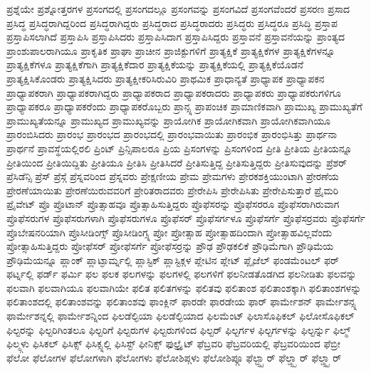 {ಪ್ರಶ್ನೆಯೇ
ಪ್ರಶ್ನೋತ್ತರಗಳ
ಪ್ರಸಂಗದಲ್ಲಿ
ಪ್ರಸಂಗದಲ್ಲೂ
ಪ್ರಸಂಗವನ್ನು
ಪ್ರಸಂಗವಿದೆ
ಪ್ರಸಂಗವೆಂದರೆ
ಪ್ರಸರಣ
ಪ್ರಸಾದ
ಪ್ರಸಿದ್ಧ
ಪ್ರಸಿದ್ಧರಾಗಿದ್ದರಿಂದ
ಪ್ರಸಿದ್ಧರಾಗಿದ್ದರು
ಪ್ರಸಿದ್ಧರಾದ
ಪ್ರಸಿದ್ಧರಾದರು
ಪ್ರಸಿದ್ಧರು
ಪ್ರಸಿದ್ಧರೂ
ಪ್ರಸಿದ್ಧಿ
ಪ್ರಸ್ತಾಪ
ಪ್ರಸ್ತಾಪಿಸಲಾಗಿದೆ
ಪ್ರಸ್ತಾಪಿಸಿ
ಪ್ರಸ್ತಾಪಿಸಿದರು
ಪ್ರಸ್ತಾಪಿಸಿದಾಗ
ಪ್ರಸ್ತಾಪಿಸಿದ್ದರು
ಪ್ರಸ್ತಾವನೆ
ಪ್ರಸ್ತಾವನೆಯನ್ನು
ಪ್ರಾಂತ್ಯದ
ಪ್ರಾಂಶುಪಾಲರಾಗಿಯೂ
ಪ್ರಾಕೃತಿಕ
ಪ್ರಾಘಾ
ಪ್ರಾಚೀನ
ಪ್ರಾಜಿಕ್ಟುಗಳಿಗೆ
ಪ್ರಾತ್ಯಕ್ಷಿಕೆ
ಪ್ರಾತ್ಯಕ್ಷಿಕೆಗಳ
ಪ್ರಾತ್ಯಕ್ಷಿಕೆಗಳನ್ನೂ
ಪ್ರಾತ್ಯಕ್ಷಿಕೆಗಳೂ
ಪ್ರಾತ್ಯಕ್ಷಿಕೆಗಾಗಿ
ಪ್ರಾತ್ಯಕ್ಷಿಕೆದಾರ
ಪ್ರಾತ್ಯಕ್ಷಿಕೆಯನ್ನು
ಪ್ರಾತ್ಯಕ್ಷಿಕೆಯಲ್ಲಿ
ಪ್ರಾತ್ಯಕ್ಷಿಕೆಯೊಡನೆ
ಪ್ರಾತ್ಯಕ್ಷಿಸಿಕೊಂಡರು
ಪ್ರಾತ್ಯಕ್ಷಿಸಿದರು
ಪ್ರಾತ್ಯಕ್ಷೀಕರಿಸಿರುವಿರಿ
ಪ್ರಾಥಮಿಕ
ಪ್ರಾಧಾನ್ಯತೆ
ಪ್ರಾಧ್ಯಾಪಕ
ಪ್ರಾಧ್ಯಾಪಕನ
ಪ್ರಾಧ್ಯಾಪಕರಾಗಿ
ಪ್ರಾಧ್ಯಾಪಕರಾಗಿದ್ದರು
ಪ್ರಾಧ್ಯಾಪಕರಾದ
ಪ್ರಾಧ್ಯಾಪಕರಾದರು
ಪ್ರಾಧ್ಯಾಪಕರು
ಪ್ರಾಧ್ಯಾಪಕರುಗಳಿಗೂ
ಪ್ರಾಧ್ಯಾಪಕರೂ
ಪ್ರಾಧ್ಯಾಪಕರೆಂದು
ಪ್ರಾಧ್ಯಾಪಕರೊಬ್ಬರು
ಪ್ರಾನ್ಸ್ನ
ಪ್ರಾಪಂಚಿಕ
ಪ್ರಾಮಾಣಿಕವಾಗಿ
ಪ್ರಾಮುಖ್ಯ
ಪ್ರಾಮುಖ್ಯತೆಗೆ
ಪ್ರಾಮುಖ್ಯತೆಯನ್ನೂ
ಪ್ರಾಮುಖ್ಯದ
ಪ್ರಾಮುಖ್ಯವನ್ನು
ಪ್ರಾಯೋಗಿಕ
ಪ್ರಾಯೋಗಿಕವಾಗಿ
ಪ್ರಾಯೋಗಿಕವಾಗಿಯೂ
ಪ್ರಾರಂಬಿಸಿದರು
ಪ್ರಾರಂಭ
ಪ್ರಾರಂಭದ
ಪ್ರಾರಂಭದಲ್ಲಿ
ಪ್ರಾರಂಭವಾಯಿತು
ಪ್ರಾರಂಭಿಕ
ಪ್ರಾರಂಭಿಸಿತ್ತು
ಪ್ರಾರ್ಥನಾ
ಪ್ರಾರ್ಥನೆ
ಪ್ರಾವಸ್ಥೆಯಲ್ಲಿರಲಿ
ಪ್ರಿಂಟ್
ಪ್ರಿನ್ಸಿಪಾಲರೂ
ಪ್ರಿಯ
ಪ್ರಿಸಂಗಳನ್ನು
ಪ್ರಿಸಂಗಳಿಂದ
ಪ್ರೀತಿ
ಪ್ರೀತಿಯ
ಪ್ರೀತಿಯನ್ನೂ
ಪ್ರೀತಿಯಿಂದ
ಪ್ರೀತಿಯಿದ್ದಿತು
ಪ್ರೀತಿಯೂ
ಪ್ರೀತಿಸಿ
ಪ್ರೀತಿಸಿದರೆ
ಪ್ರೀತಿಸುತ್ತಿದ್ದ
ಪ್ರೀತಿಸುತ್ತಿದ್ದರು
ಪ್ರೀತಿಸುವುದನ್ನು
ಪ್ರೆಶರ್
ಪ್ರೆಸಿಡೆನ್ಸಿ
ಪ್ರೆಸ್
ಪ್ರೆಸ್ಗೆ
ಪ್ರೆಸ್ನವರಿಂದ
ಪ್ರೆಸ್ನವರು
ಪ್ರೇಕ್ಷಣೀಯ
ಪ್ರೇಮ
ಪ್ರೇಮಗಳು
ಪ್ರೇರಕಶಕ್ತಿಯುಂಟಾಗಿ
ಪ್ರೇರಣೆಯ
ಪ್ರೇರಣೆಯಾಯಿತು
ಪ್ರೇರಣೆಯಿರುವವರಿಗೆ
ಪ್ರೇರಿತರಾದವರು
ಪ್ರೇರೇಪಿಸಿ
ಪ್ರೇರೇಪಿಸಿತು
ಪ್ರೇರೇಪಿಸುತ್ತಾರೆ
ಪ್ರೈಮರಿ
ಪ್ರೈವೇಟ್
ಪ್ರೊ
ಪ್ರೊಟಾನ್
ಪ್ರೊತ್ಸಾಹವೂ
ಪ್ರೊತ್ಸಾಹಿಸುತ್ತಿದ್ದರು
ಪ್ರೊಫೆಸರನ್ನು
ಪ್ರೊಫೆಸರರೂ
ಪ್ರೊಫೆಸರಾಗಿರುವಾಗ
ಪ್ರೊಫೆಸರುಗಳ
ಪ್ರೊಫೆಸರುಗಳಾಗಿ
ಪ್ರೊಫೆಸರುಗಳೂ
ಪ್ರೊಫೆಸರ್
ಪ್ರೊಫೆಸರ್ಗಳೂ
ಪ್ರೊಫೆಸರ್ಗೆ
ಪ್ರೊಫೆಸರ್ರವರು
ಪ್ರೊಫೆಸರ್ಗೆ
ಪ್ರೊಬೇಷನರಿಯಾಗಿ
ಪ್ರೊಸೀಡಿಂಗ್ಸ್
ಪ್ರೊಸೀಡಿಂಗ್ಸ್ನ
ಪ್ರೋ
ಪ್ರೋತ್ಸಾಹ
ಪ್ರೋತ್ಸಾಹದಿಂದಾಗಿ
ಪ್ರೋತ್ಸಾಹವಿಲ್ಲವೆಂದು
ಪ್ರೋತ್ಸಾಹಿಸುತ್ತಿದ್ದರು
ಪ್ರೋಫೆಸರ್
ಪ್ರೋಫೆಸರ್ಗೆ
ಪ್ರೋಫೆಸರ್ರನ್ನು
ಪ್ರೌಢ
ಪ್ರೌಢಕಲಿಕೆ
ಪ್ರೌಢಿಮೆಗಾಗಿ
ಪ್ರೌಢಿಮೆಯ
ಪ್ರೌಢಿಮೆಯನ್ನೂ
ಪ್ಲಾಂಕ್
ಪ್ಲಾಟ್ಫಾರ್ಮ್ನಲ್ಲಿ
ಪ್ಲಾಸ್ಟಿಕ್
ಪ್ಲಾಸ್ಟಿಕ್ಗಳ
ಪ್ಲೇಟಿನ
ಪ್ಲೇಟ್
ಪ್ಲೈಜೆಲ್
ಫಂಡಮೆಂಟಲ್
ಫರ್
ಫರ್ಟ್ನಲ್ಲಿ
ಫರ್ಡ್
ಫರ್ಮಿ
ಫಲ
ಫಲಕ
ಫಲಗಳನ್ನು
ಫಲಗಳಲ್ಲಿ
ಫಲಗಳಿಗೆ
ಫಲನೀಡತೊಡಗಿದ
ಫಲನೀಡಿತು
ಫಲವನ್ನು
ಫಲವಾಗಿ
ಫಲವಾಗಿಯೂ
ಫಲವಾಗಿಯೇ
ಫಲಿತ
ಫಲಿತಗಳನ್ನು
ಫಲಿತವು
ಫಲಿತಾಂಶ
ಫಲಿತಾಂಶಕ್ಕಾಗಿ
ಫಲಿತಾಂಶಗಳನ್ನು
ಫಲಿತಾಂಶದಲ್ಲಿ
ಫಲಿತಾಂಶವನ್ನು
ಫಲಿತಾಂಶವು
ಫಾಂಕ್ಲಿನ್
ಫಾರಡೇ
ಫಾರಡೇಯ
ಫಾರ್
ಫಾರ್ಮೇಶನ್
ಫಾರ್ಮೇಶನ್ಸ್ನ
ಫಾರ್ಮೇಶನ್ನಲ್ಲಿ
ಫಾರ್ಮೇಶನ್ನಿಂದ
ಫಿಲಡೆಲ್ಫಿಯಾ
ಫಿಲಡೆಲ್ಫಿಯಾದ
ಫಿಲಮೆಂಟ್
ಫಿಲಾಸೊಫಿಕಲ್
ಫಿಲೋಸೊಫಿಕಲ್
ಫಿಲ್ಟರನ್ನು
ಫಿಲ್ಟರಿಗಿಂತಲೂ
ಫಿಲ್ಟರಿಗೆ
ಫಿಲ್ಟರುಗಳ
ಫಿಲ್ಟರುಗಳಿಂದ
ಫಿಲ್ಟರ್
ಫಿಲ್ಟರ್ಗಳ
ಫಿಲ್ಟರ್ಗಳನ್ನು
ಫಿಲ್ಟರ್ನ್ನು
ಫಿಲ್ಮ್
ಫಿಲ್ಮ್ಗಳು
ಫಿಸಿಕಲ್
ಫಿಸಿಕ್ಸ್
ಫಿಸಿಕ್ಸ್ನಲ್ಲಿ
ಫಿಸಿಸ್ಟ್
ಫೀನಿಕ್ಸ್
ಫುಲ್ಬ್ರೈಟ್
ಫೆಬ್ರವರಿ
ಫೆಬ್ರವರಿಯಲ್ಲಿ
ಫೆಬ್ರವರಿಯಿಂದ
ಫೆಬ್ರೀ
ಫೆಲೋ
ಫೆಲೋಗಳ
ಫೆಲೋಗಳಾಗಿ
ಫೆಲೋಗಳು
ಫೆಲೋಶಿಪ್ಗಳು
ಫೆಲೋಶಿಪ್ಗೂ
ಫೆಲ್ಟ್ಸ್ಟಾರ್
ಫೆಲ್ಡ್ಸ್ಪಾರ್
ಫೆಲ್ಡ್ಸ್ಟಾರ್
}
